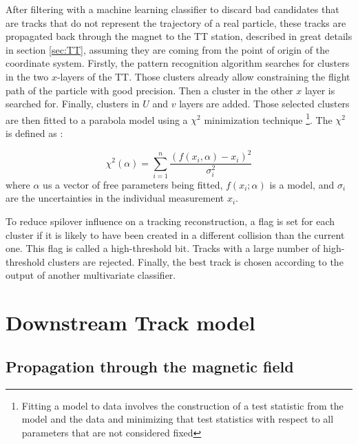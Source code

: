After filtering with a machine learning classifier to discard bad candidates that are tracks that do not represent the trajectory of a real particle, these tracks are propagated back through the magnet to the TT station, described in great details in section \ref{sec:TT}, assuming they are coming from the point of origin of the coordinate system. 
Firstly, the pattern recognition algorithm searches for clusters in the two $x $-layers of the TT.  Those clusters already allow constraining the flight path of the particle with good precision. Then a cluster in the other $x$ layer is searched for. Finally, clusters in $U$ and $v$ layers are added. 
 Those selected clusters are then fitted to a parabola model using a $\chi^{2} $ minimization technique \footnote{Fitting a model to data involves the construction of a test statistic from the model and the data and minimizing that test statistics with respect to all parameters that are not considered fixed }. 
 The   $\chi^{2} $ is defined as :

\begin{equation}
\chi^{2}(\alpha) = \sum_{i=1}^{n} \frac{(f(x_i, \alpha)-x_i)^{2}}{\sigma_{i}^{2}}
\end{equation}
where  $\alpha$ us a vector of free parameters being fitted, $f(x_i;\alpha)$  is a model, and $\sigma_i$ are the uncertainties in the individual measurement $x_i$.  

To reduce spilover influence on a tracking reconstruction, a flag is set for each cluster if it is likely to have been created in a different collision than the current one.  This flag is called a high-threshold bit.  Tracks with a large number of high-threshold clusters are rejected. 
Finally, the best track is chosen according to the output of another multivariate classifier. 



\section{Downstream Track model}



\subsection{Propagation through the magnetic field}
\label{sec:magPoint}

